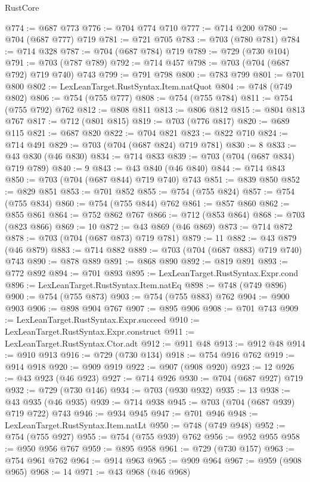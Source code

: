 \begin{lexlean}{RustCore}
\begin{coremodule}
@774 := @687 @773
@776 := @704 @774 @710
@777 := @714 @200
@780 := @704 (@687 @777) @719
@781 := @721 @705
@783 := @703 (@780 @781)
@784 := @714 @328
@787 := @704 (@687 @784) @719
@789 := @729 (@730 @104)
@791 := @703 (@787 @789)
@792 := @714 @457
@798 := @703 (@704 (@687 @792) @719 @740) @743
@799 := @791 @798
@800 := @783 @799
@801 := @701 @800
@802 := LexLeanTarget.RustSyntax.Item.natQuot
@804 := @748 (@749 @802)
@806 := @754 (@755 @777)
@808 := @754 (@755 @784)
@811 := @754 (@755 @792) @762
@812 := @808 @811
@813 := @806 @812
@815 := @804 @813 @767
@817 := @712 (@801 @815)
@819 := @703 (@776 @817)
@820 := @689 @115
@821 := @687 @820
@822 := @704 @821
@823 := @822 @710
@824 := @714 @491
@829 := @703 (@704 (@687 @824) @719 @781)
@830 := 8
@833 := @43 @830 (@46 @830)
@834 := @714 @833
@839 := @703 (@704 (@687 @834) @719 @789)
@840 := 9
@843 := @43 @840 (@46 @840)
@844 := @714 @843
@850 := @703 (@704 (@687 @844) @719 @740) @743
@851 := @839 @850
@852 := @829 @851
@853 := @701 @852
@855 := @754 (@755 @824)
@857 := @754 (@755 @834)
@860 := @754 (@755 @844) @762
@861 := @857 @860
@862 := @855 @861
@864 := @752 @862 @767
@866 := @712 (@853 @864)
@868 := @703 (@823 @866)
@869 := 10
@872 := @43 @869 (@46 @869)
@873 := @714 @872
@878 := @703 (@704 (@687 @873) @719 @781)
@879 := 11
@882 := @43 @879 (@46 @879)
@883 := @714 @882
@889 := @703 (@704 (@687 @883) @719 @740) @743
@890 := @878 @889
@891 := @868 @890
@892 := @819 @891
@893 := @772 @892
@894 := @701 @893
@895 := LexLeanTarget.RustSyntax.Expr.cond
@896 := LexLeanTarget.RustSyntax.Item.natEq
@898 := @748 (@749 @896)
@900 := @754 (@755 @873)
@903 := @754 (@755 @883) @762
@904 := @900 @903
@906 := @898 @904 @767
@907 := @895 @906
@908 := @701 @743
@909 := LexLeanTarget.RustSyntax.Expr.succeed
@910 := LexLeanTarget.RustSyntax.Expr.construct
@911 := LexLeanTarget.RustSyntax.Ctor.adt
@912 := @911 @48
@913 := @912 @48
@914 := @910 @913
@916 := @729 (@730 @134)
@918 := @754 @916 @762
@919 := @914 @918
@920 := @909 @919
@922 := @907 (@908 @920)
@923 := 12
@926 := @43 @923 (@46 @923)
@927 := @714 @926
@930 := @704 (@687 @927) @719
@932 := @729 (@730 @146)
@934 := @703 (@930 @932)
@935 := 13
@938 := @43 @935 (@46 @935)
@939 := @714 @938
@945 := @703 (@704 (@687 @939) @719 @722) @743
@946 := @934 @945
@947 := @701 @946
@948 := LexLeanTarget.RustSyntax.Item.natLt
@950 := @748 (@749 @948)
@952 := @754 (@755 @927)
@955 := @754 (@755 @939) @762
@956 := @952 @955
@958 := @950 @956 @767
@959 := @895 @958
@961 := @729 (@730 @157)
@963 := @754 @961 @762
@964 := @914 @963
@965 := @909 @964
@967 := @959 (@908 @965)
@968 := 14
@971 := @43 @968 (@46 @968)

\end{coremodule}
\end{lexlean}

